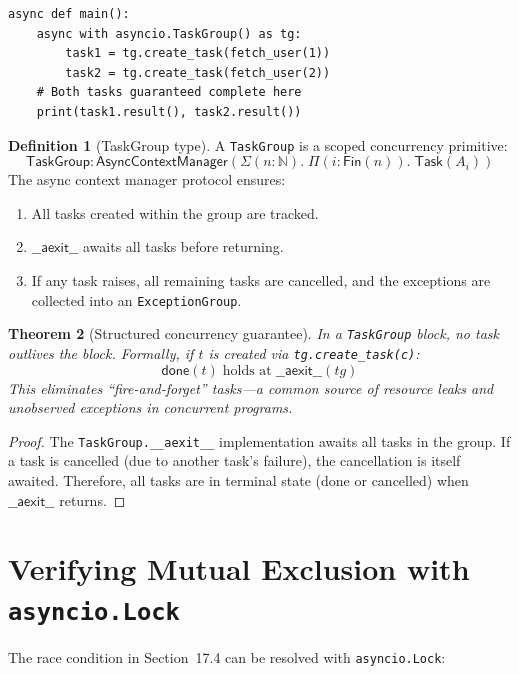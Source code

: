 \documentclass[11pt,a4paper]{report}
\theoremstyle{definition}
\newtheorem{definition}{Definition}[chapter]
\theoremstyle{plain}
\newtheorem{theorem}[definition]{Theorem}
\newcommand{\Nat}{\mathbb{N}}
\begin{document}
\begin{lstlisting}[style=python]
async def main():
    async with asyncio.TaskGroup() as tg:
        task1 = tg.create_task(fetch_user(1))
        task2 = tg.create_task(fetch_user(2))
    # Both tasks guaranteed complete here
    print(task1.result(), task2.result())
\end{lstlisting}

\begin{definition}[TaskGroup type]
A \lstinline[style=python]{TaskGroup} is a scoped concurrency primitive:
\[
  \mathsf{TaskGroup} : \mathsf{AsyncContextManager}\left(
    \Sigma(n : \Nat).\;
    \Pi(i : \mathsf{Fin}(n)).\; \mathsf{Task}(A_i)
  \right)
\]
The async context manager protocol ensures:
\begin{enumerate}
  \item All tasks created within the group are tracked.
  \item $\mathsf{\_\_aexit\_\_}$ awaits all tasks before returning.
  \item If any task raises, all remaining tasks are cancelled, and the
    exceptions are collected into an
    \lstinline[style=python]{ExceptionGroup}.
\end{enumerate}
\end{definition}

\begin{theorem}[Structured concurrency guarantee]
In a \lstinline[style=python]{TaskGroup} block, no task outlives the block.
Formally, if $t$ is created via
\lstinline[style=python]{tg.create_task(c)}:
\[
  \mathsf{done}(t) \;\text{holds at}\;
    \mathsf{\_\_aexit\_\_}(\mathit{tg})
\]
This eliminates ``fire-and-forget'' tasks---a common source of resource
leaks and unobserved exceptions in concurrent programs.
\end{theorem}
\begin{proof}
The \lstinline[style=python]{TaskGroup.__aexit__} implementation awaits
all tasks in the group.  If a task is cancelled (due to another task's
failure), the cancellation is itself awaited.  Therefore, all tasks
are in terminal state (\textsf{done} or \textsf{cancelled}) when
$\mathsf{\_\_aexit\_\_}$ returns.
\end{proof}

\section{Verifying Mutual Exclusion with \texttt{asyncio.Lock}}

The race condition in Section~17.4 can be resolved with
\lstinline[style=python]{asyncio.Lock}:
\end{document}
